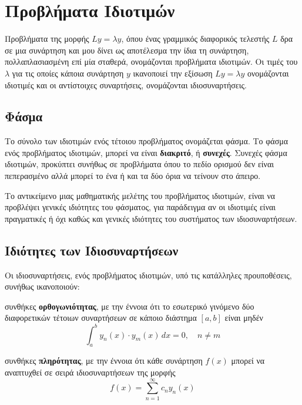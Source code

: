 \section*{Προβλήματα Ιδιοτιμών}

Προβλήματα της μορφής $ Ly= \lambda y $, όπου ένας γραμμικός διαφορικός τελεστής $L$ 
δρα σε μια συνάρτηση και μου δίνει ως αποτέλεσμα την ίδια τη συνάρτηση, πολλαπλασιασμένη 
επί μία σταθερά, ονομάζονται \textcolor{Col1}{προβλήματα ιδιοτιμών}.
Οι τιμές του $ \lambda $ για τις οποίες κάποια συνάρτηση $ y $ ικανοποιεί την εξίσωση 
$ Ly= \lambda y $ ονομάζονται \textcolor{Col1}{ιδιοτιμές} και οι αντίστοιχες 
συναρτήσεις, ονομάζονται \textcolor{Col1}{ιδιοσυναρτήσεις}.

\subsection*{Φάσμα}

Το σύνολο των ιδιοτιμών ενός τέτοιου προβλήματος ονομάζεται \textcolor{Col1}{φάσμα}. 
Το φάσμα ενός προβλήματος ιδιοτιμών, μπορεί να είναι \textbf{διακριτό}, ή 
\textbf{συνεχές}. Συνεχές φάσμα ιδιοτιμών, προκύπτει συνήθως σε προβλήματα όπου το πεδίο 
ορισμού δεν είναι πεπερασμένο αλλά μπορεί το ένα ή και τα δύο όρια να τείνουν στο άπειρο.

\begin{rem}
  Το αντικείμενο μιας μαθηματικής μελέτης του προβλήματος ιδιοτιμών, είναι να 
  προβλέψει γενικές ιδιότητες του φάσματος, για παράδειγμα αν οι ιδιοτιμές είναι 
  πραγματικές ή όχι καθώς και γενικές ιδιότητες του συστήματος των ιδιοσυναρτήσεων.
\end{rem}

\subsection*{Ιδιότητες των Ιδιοσυναρτήσεων}

Οι ιδιοσυναρτήσεις, ενός προβλήματος ιδιοτιμών, υπό τις κατάλληλες προυποθέσεις, συνήθως 
ικανοποιούν:
\begin{myitemize}
  \item συνθήκες \textbf{ορθογωνιότητας}, με την έννοια ότι το εσωτερικό γινόμενο 
    δύο διαφορετικών τέτοιων συναρτήσεων σε κάποιο διάστημα $[a,b]$ είναι μηδέν
    \[
      \int _{a}^{b}y_{n}(x)\cdot y_{m}(x) \,{dx} = 0, \quad n \neq m
    \] 
  \item συνθήκες \textbf{πληρότητας}, με την έννοια ότι κάθε συνάρτηση $ f(x) $ μπορεί 
    να αναπτυχθεί σε σειρά ιδιοσυναρτήσεων της μορφής
    \[
      f(x) = \sum_{n=1}^{\infty} c_{n} y_{n}(x) 
    \]
\end{myitemize}

